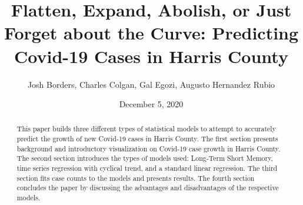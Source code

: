 \documentclass{article}
\title{Flatten, Expand, Abolish, or Just Forget about the Curve: Predicting Covid-19 Cases in Harris County}
\author{Josh Borders, Charles Colgan, Gal Egozi, Augusto Hernandez Rubio}
\date{December 5, 2020}
\begin{document}
\maketitle

\begin{abstract}
This paper builds three different types of statistical models to attempt to accurately predict the growth of new Covid-19 cases in Harris County. The first section presents background and introductory visualization on Covid-19 case growth in Harris County. The second section introduces the types of models used: Long-Term Short Memory, time series regression with cyclical trend, and a standard linear regression. The third section fits case counts to the models and presents results. The fourth section concludes the paper by discussing the advantages and disadvantages of the respective models.
\end{abstract}

\end{document}
